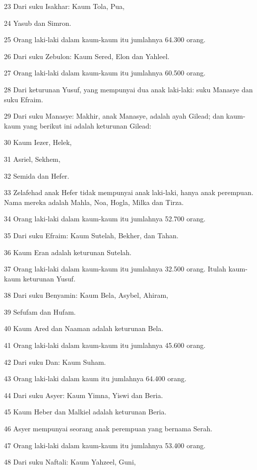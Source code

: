 \par 23 Dari suku Isakhar: Kaum Tola, Pua,
\par 24 Yasub dan Simron.
\par 25 Orang laki-laki dalam kaum-kaum itu jumlahnya 64.300 orang.
\par 26 Dari suku Zebulon: Kaum Sered, Elon dan Yahleel.
\par 27 Orang laki-laki dalam kaum-kaum itu jumlahnya 60.500 orang.
\par 28 Dari keturunan Yusuf, yang mempunyai dua anak laki-laki: suku Manasye dan suku Efraim.
\par 29 Dari suku Manasye: Makhir, anak Manasye, adalah ayah Gilead; dan kaum-kaum yang berikut ini adalah keturunan Gilead:
\par 30 Kaum Iezer, Helek,
\par 31 Asriel, Sekhem,
\par 32 Semida dan Hefer.
\par 33 Zelafehad anak Hefer tidak mempunyai anak laki-laki, hanya anak perempuan. Nama mereka adalah Mahla, Noa, Hogla, Milka dan Tirza.
\par 34 Orang laki-laki dalam kaum-kaum itu jumlahnya 52.700 orang.
\par 35 Dari suku Efraim: Kaum Sutelah, Bekher, dan Tahan.
\par 36 Kaum Eran adalah keturunan Sutelah.
\par 37 Orang laki-laki dalam kaum-kaum itu jumlahnya 32.500 orang. Itulah kaum-kaum keturunan Yusuf.
\par 38 Dari suku Benyamin: Kaum Bela, Asybel, Ahiram,
\par 39 Sefufam dan Hufam.
\par 40 Kaum Ared dan Naaman adalah keturunan Bela.
\par 41 Orang laki-laki dalam kaum-kaum itu jumlahnya 45.600 orang.
\par 42 Dari suku Dan: Kaum Suham.
\par 43 Orang laki-laki dalam kaum itu jumlahnya 64.400 orang.
\par 44 Dari suku Asyer: Kaum Yimna, Yiswi dan Beria.
\par 45 Kaum Heber dan Malkiel adalah keturunan Beria.
\par 46 Asyer mempunyai seorang anak perempuan yang bernama Serah.
\par 47 Orang laki-laki dalam kaum-kaum itu jumlahnya 53.400 orang.
\par 48 Dari suku Naftali: Kaum Yahzeel, Guni,
